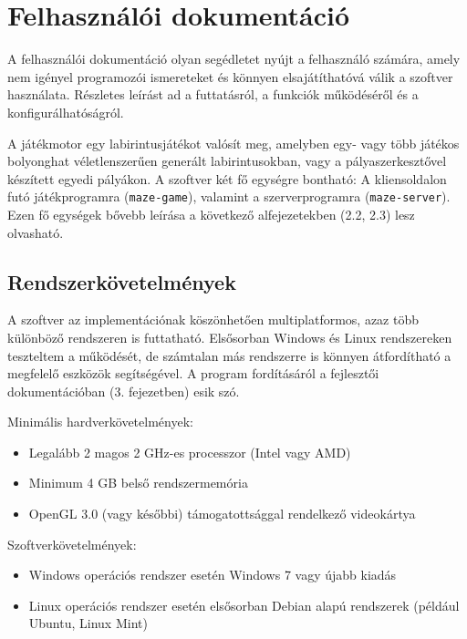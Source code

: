 \chapter{Felhasználói dokumentáció} %
\label{ch:user}

A felhasználói dokumentáció olyan segédletet nyújt a felhasználó számára, amely nem igényel programozói ismereteket és könnyen elsajátíthatóvá válik a szoftver használata. Részletes leírást ad a futtatásról, a funkciók működéséről és a konfigurálhatóságról.

A játékmotor egy labirintusjátékot valósít meg, amelyben egy- vagy több játékos bolyonghat véletlenszerűen generált labirintusokban, vagy a pályaszerkesztővel készített egyedi pályákon. A szoftver két fő egységre bontható: A kliensoldalon futó játékprogramra (\verb|maze-game|), valamint a szerverprogramra (\verb|maze-server|). Ezen fő egységek bővebb leírása a következő alfejezetekben (2.2, 2.3) lesz olvasható.

\section{Rendszerkövetelmények}

A szoftver az implementációnak köszönhetően multiplatformos, azaz több különböző rendszeren is futtatható. Elsősorban Windows és Linux rendszereken teszteltem a működését, de számtalan más rendszerre is könnyen átfordítható a megfelelő eszközök segítségével. A program fordításáról a fejlesztői dokumentációban (3. fejezetben) esik szó.

Minimális hardverkövetelmények:

\begin{itemize}
	\item Legalább 2 magos 2 GHz-es processzor (Intel vagy AMD)
	\item Minimum 4 GB belső rendszermemória
	\item OpenGL 3.0 (vagy későbbi) támogatottsággal rendelkező videokártya
\end{itemize}

Szoftverkövetelmények:

\begin{itemize}
	\item Windows operációs rendszer esetén Windows 7 vagy újabb kiadás
	\item Linux operációs rendszer esetén elsősorban Debian alapú rendszerek (például Ubuntu, Linux Mint)
\end{itemize}

